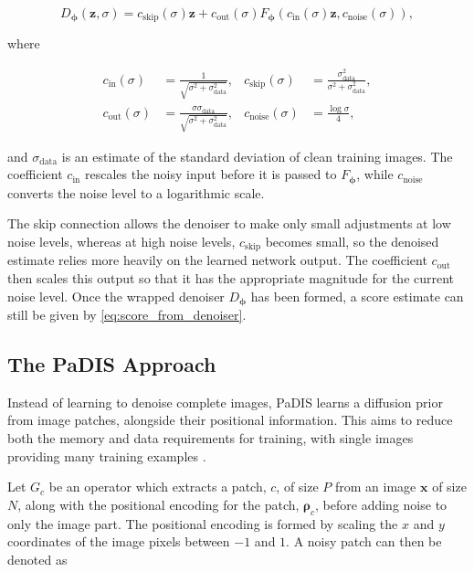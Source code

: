 \begin{equation} D_{\boldsymbol{\phi}}(\mathbf{z},\sigma) =
c_{\mathrm{skip}}(\sigma)\mathbf{z} + c_{\mathrm{out}}(\sigma)
F_{\boldsymbol{\phi}} \left( c_{\mathrm{in}}(\sigma)\mathbf{z},
c_{\mathrm{noise}}(\sigma) \right), \label{eq:edm_preconditioned_denoiser}
\end{equation}

where

\begin{align} c_{\mathrm{in}}(\sigma) &=
\frac{1}{\sqrt{\sigma^2+\sigma_{\mathrm{data}}^2}}, & c_{\mathrm{skip}}(\sigma)
&= \frac{\sigma_{\mathrm{data}}^2}{\sigma^2+\sigma_{\mathrm{data}}^2}, \\
c_{\mathrm{out}}(\sigma) &=
\frac{\sigma\sigma_{\mathrm{data}}}{\sqrt{\sigma^2+\sigma_{\mathrm{data}}^2}}, &
c_{\mathrm{noise}}(\sigma) &= \frac{\log \sigma}{4},
\label{eq:edm_preconditioning_coefficients} \end{align}

and $\sigma_{\mathrm{data}}$ is an estimate of the standard deviation of
clean training images. The coefficient $c_{\mathrm{in}}$ rescales the noisy
input before it is passed to $F_{\boldsymbol{\phi}}$, while $c_{\mathrm{noise}}$
converts the noise level to a logarithmic scale.

The skip connection allows the denoiser to make only small adjustments at low noise levels, whereas at high noise levels, $c_{\mathrm{skip}}$ becomes small, so the denoised estimate relies more heavily on the learned network output. The coefficient $c_{\mathrm{out}}$ then scales this output so that it has the appropriate magnitude for the current noise level. Once the wrapped denoiser $D_{\boldsymbol{\phi}}$ has been formed, a score estimate can still be given by \autoref{eq:score_from_denoiser}.

\subsection{The PaDIS Approach}
\label{subsec:padis_approach}

Instead of learning to denoise complete images, PaDIS learns a diffusion prior from image patches, alongside their positional information. This aims to reduce both the memory and data requirements for training, with single images providing many training examples \cite{hu_learning_2024}.

Let $G_c$ be an operator which extracts a patch, $c$, of size $P$ from an image $\mathbf{x}$ of size $N$, along with the positional encoding for the patch, $\boldsymbol{\rho}_c$, before adding noise to only the image part. The positional encoding is formed by scaling the $x$ and $y$ coordinates of the image pixels between $-1$ and $1$. A noisy patch can then be denoted as

